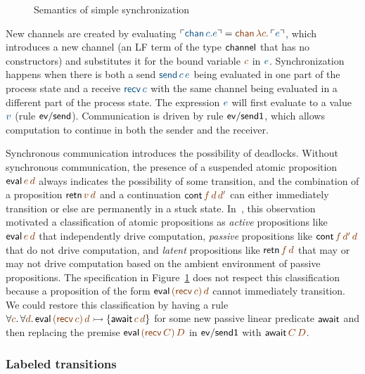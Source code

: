 \begin{figure}
\caption{Semantics of simple synchronization}
\label{fig:dest-synch}
\end{figure}

New channels are created by evaluating $\interp{{\sf chan}\,c.e} =
\lf{{\sf chan}\,\lambda c.\,\interp{e}}$, which introduces a new channel
(an LF term of the type ${\sf channel}$ that has no constructors) and
substitutes it for the bound variable $\lf{c}$ in $\obj{e}$. 
Synchronization happens when
there is both a send $\obj{{\sf send}\,c\,e}$ being evaluated
in one part of the process state and a
receive $\obj{{\sf recv}\,c}$ with the same
channel being evaluated in a different part of the process state. 
The expression $\obj{e}$ will first evaluate to a value $\obj{v}$ 
(rule ${\sf ev/send}$). Communication is
driven by rule ${\sf ev/send1}$, which allows computation to continue
in both the sender and the receiver.

Synchronous communication introduces the possibility of
deadlocks. Without synchronous communication, the presence of a
suspended atomic proposition ${\sf eval}\,\lf{e}\,\lf{d}$ always
indicates the possibility of some transition, and the combination of a
proposition ${\sf retn}\,\lf{v}\,\lf{d}$ and a continuation ${\sf
  cont}\,\lf{f}\,\lf{d}\,\lf{d'}$ can either immediately transition or
else are permanently in a stuck
state. In~\cite{pfenning09substructural}, this observation motivated a
classification of atomic propositions as {\it active} propositions
like ${\sf eval}\,\lf{e}\,\lf{d}$ that independently drive
computation, {\it passive} propositions like ${\sf
  cont}\,\lf{f}\,\lf{d'}\,\lf{d}$ that do not drive computation, and
{\it latent} propositions like ${\sf retn}\,\lf{f}\,\lf{d}$ that may
or may not drive computation based on the ambient environment of
passive propositions. The specification in Figure~\ref{fig:dest-synch}
does not respect this classification because a proposition of the form
${\sf eval}\,\lf{({\sf recv}\,c)}\,\lf{d}$ cannot immediately
transition. We could restore this classification by having a rule
$\forall \lf{c}.\,\forall \lf{d}.\, {\sf eval}\,\lf{({\sf
    recv}\,c)}\,\lf{d} \lefti \{ {\sf await}\,\lf{c}\,\lf{d} \}$ for
some new passive linear predicate ${\sf await}$ and then replacing the
premise ${\sf eval}\,\lf{({\sf recv}\,C)}\,\lf{D}$ in ${\sf ev/send1}$
with ${\sf await}\,\lf{C}\,\lf{D}$.

\subsubsection{Labeled transitions}

